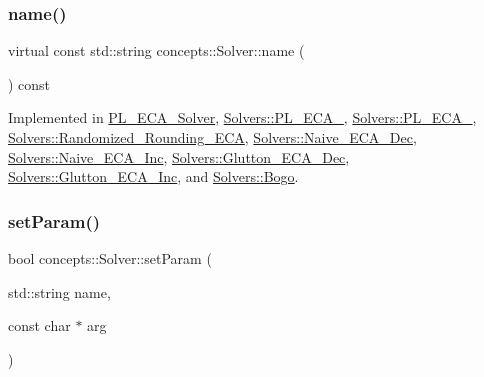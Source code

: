\mbox{\label{classconcepts_1_1_solver_ab995568318a506446228f45cab2fcce7}} 
\subsubsection{\texorpdfstring{name()}{name()}}
{\footnotesize\ttfamily virtual const std\+::string concepts\+::\+Solver\+::name (\begin{DoxyParamCaption}{ }\end{DoxyParamCaption}) const\hspace{0.3cm}{\ttfamily [pure virtual]}}



Implemented in \hyperlink{class_p_l___e_c_a___solver_a4cbbcbfd62d91dacb448470456ac57c7}{P\+L\+\_\+\+E\+C\+A\+\_\+\+Solver}, \hyperlink{class_solvers_1_1_p_l___e_c_a__3_ac265db86ca64eb34ba5370e905686a21}{Solvers\+::\+P\+L\+\_\+\+E\+C\+A\+\_}, \hyperlink{class_solvers_1_1_p_l___e_c_a__2_ab9879a904a2545d929bd2956f23fa1aa}{Solvers\+::\+P\+L\+\_\+\+E\+C\+A\+\_}, \hyperlink{class_solvers_1_1_randomized___rounding___e_c_a_aa9ae623007f23dbd73d367649021c8a9}{Solvers\+::\+Randomized\+\_\+\+Rounding\+\_\+\+E\+CA}, \hyperlink{class_solvers_1_1_naive___e_c_a___dec_a171d5188c9901c251c57efdc9c8b954b}{Solvers\+::\+Naive\+\_\+\+E\+C\+A\+\_\+\+Dec}, \hyperlink{class_solvers_1_1_naive___e_c_a___inc_ace6070af722e226fcd2f9b746cc12944}{Solvers\+::\+Naive\+\_\+\+E\+C\+A\+\_\+\+Inc}, \hyperlink{class_solvers_1_1_glutton___e_c_a___dec_a2990dbcfecba9673d4bbae331aee1a04}{Solvers\+::\+Glutton\+\_\+\+E\+C\+A\+\_\+\+Dec}, \hyperlink{class_solvers_1_1_glutton___e_c_a___inc_afda6b975b3a066aa76711730e5fa2f48}{Solvers\+::\+Glutton\+\_\+\+E\+C\+A\+\_\+\+Inc}, and \hyperlink{class_solvers_1_1_bogo_a496539bab5a74757fe6d50e78e0a641f}{Solvers\+::\+Bogo}.

\mbox{\label{classconcepts_1_1_solver_a2158cd44bcaa736d828a1dcb49058db0}} 
\subsubsection{\texorpdfstring{set\+Param()}{setParam()}}
{\footnotesize\ttfamily bool concepts\+::\+Solver\+::set\+Param (\begin{DoxyParamCaption}\item[{std\+::string}]{name,  }\item[{const char $\ast$}]{arg }\end{DoxyParamCaption})\hspace{0.3cm}{\ttfamily [inline]}}

